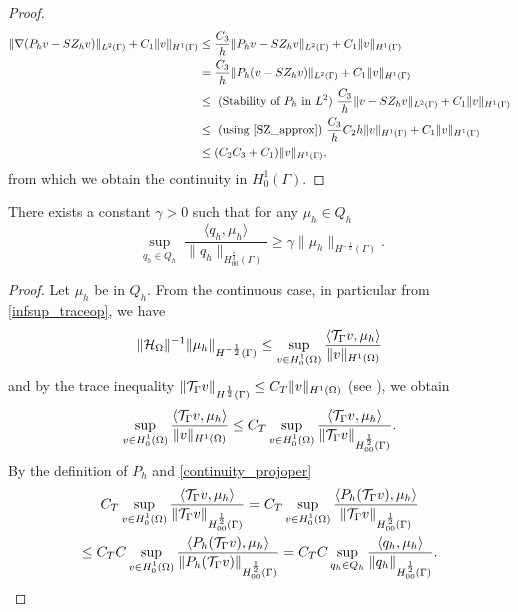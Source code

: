 \begin{proof}
\begin{equation*}
\begin{split}
\|\nabla (P_h v - SZ_h v)\|_{L^2(\Gamma)} + C_1\|v\|_{H^1(\Gamma)}
&\leq \frac{C_3}{h} \|P_h v - SZ_h v\|_{L^2(\Gamma)} + C_1\|v\|_{H^1(\Gamma)}\\
&= \frac{C_3}{h} \|P_h (v - SZ_h v)\|_{L^2(\Gamma)} + C_1\|v\|_{H^1(\Gamma)}\\
&\leq  \text{ (Stability of $P_h$ in $L^2$) } \frac{C_3}{h} \|v - SZ_h v\|_{L^2(\Gamma)} + C_1\|v\|_{H^1(\Gamma)}\\
&\leq \text{ (using \eqref{SZ_approx}) } \frac{C_3}{h} C_2 h  \| v\|_{H^1(\Gamma)} + C_1\|v\|_{H^1(\Gamma)}\\
&\leq (C_2 C_3 +C_1) \|v\|_{H^1(\Gamma)},
\end{split}
\end{equation*}
from which we obtain the continuity in $H^1_0(\Gamma)$.
\end{proof}
\begin{lemma}\label{lemma:trspace_infsup} 
There exists a constant $\gamma >0$ such that for any $\mu_h\in Q_h$
\begin{equation*}
\sup_{\substack{q_h \in Q_h}} \frac{\langle q_h , \mu_h \rangle}{ \|q_h\|_{H^{\frac 12}_{00}(\Gamma)}} \geq \gamma \|\mu_h\|_{H^{-\frac 12}(\Gamma)}.
\end{equation*} 
\end{lemma}
\begin{proof}
Let $\mu_h$ be in $Q_h$. From the continuous case, in particular from \eqref{infsup_traceop}, we have
\begin{equation*}
\|\mathcal{H}_\Omega\|^{-1} \|\mu_h\|_{H^{-\frac 12}(\Gamma)} \leq \sup_{\substack{v \in H^1_0(\Omega)}} \frac{\langle {\mathcal{T}_\Gamma} v , \mu_h \rangle}{\|v\|_{H^1(\Omega)}} 
\end{equation*}
and by the trace inequality $\|{\mathcal{T}_\Gamma} v\|_{H^\frac 12 (\Gamma)} \leq C_T \|v\|_{H^1(\Omega)}$ (see \cite[7.56]{adams1975pure}), we obtain 
\begin{equation*}
\sup_{\substack{v \in H^1_0(\Omega)}} \frac{\langle {\mathcal{T}_\Gamma} v , \mu_h \rangle}{\|v\|_{H^1(\Omega)}}
\leq C_T \sup_{\substack{v \in H^1_0(\Omega)}} \frac{\langle {\mathcal{T}_\Gamma} v , \mu_h \rangle}{ \|{\mathcal{T}_\Gamma} v\|_{H^{\frac 12}_{00}(\Gamma)}}.
\end{equation*}
By the definition of $P_h$ and \eqref{continuity_projoper} 
\begin{multline*}
C_T \sup_{\substack{v \in H^1_0(\Omega)}} \frac{\langle {\mathcal{T}_\Gamma} v , \mu_h \rangle}{ \|{\mathcal{T}_\Gamma} v\|_{H^{\frac 12}_{00}(\Gamma)}}= C_T \sup_{\substack{v \in H^1_0(\Omega)}} \frac{\langle P_h({\mathcal{T}_\Gamma} v) , \mu_h \rangle}{ \|{\mathcal{T}_\Gamma} v\|_{H^{\frac 12}_{00}(\Gamma)}}
\\
\leq  C_T C \sup_{\substack{v \in H^1_0(\Omega)}} \frac{\langle P_h({\mathcal{T}_\Gamma} v) , \mu_h \rangle}{ \|P_h({\mathcal{T}_\Gamma} v)\|_{H^{\frac 12}_{00}(\Gamma)}}
= C_T C \sup_{\substack{q_h \in Q_h}} \frac{\langle q_h , \mu_h \rangle}{  \|q_h\|_{H^{\frac 12}_{00}(\Gamma)}}.
\end{multline*}
\end{proof}

